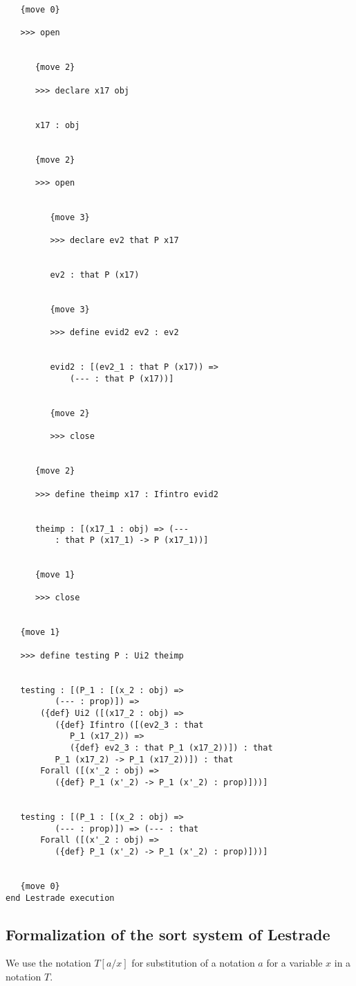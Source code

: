 \documentclass[12pt]{article}
\begin{document}
\begin{verbatim}
   {move 0}

   >>> open


      {move 2}

      >>> declare x17 obj


      x17 : obj


      {move 2}

      >>> open


         {move 3}

         >>> declare ev2 that P x17


         ev2 : that P (x17)


         {move 3}

         >>> define evid2 ev2 : ev2


         evid2 : [(ev2_1 : that P (x17)) => 
             (--- : that P (x17))]


         {move 2}

         >>> close


      {move 2}

      >>> define theimp x17 : Ifintro evid2


      theimp : [(x17_1 : obj) => (--- 
          : that P (x17_1) -> P (x17_1))]


      {move 1}

      >>> close


   {move 1}

   >>> define testing P : Ui2 theimp


   testing : [(P_1 : [(x_2 : obj) => 
          (--- : prop)]) => 
       ({def} Ui2 ([(x17_2 : obj) => 
          ({def} Ifintro ([(ev2_3 : that 
             P_1 (x17_2)) => 
             ({def} ev2_3 : that P_1 (x17_2))]) : that 
          P_1 (x17_2) -> P_1 (x17_2))]) : that 
       Forall ([(x'_2 : obj) => 
          ({def} P_1 (x'_2) -> P_1 (x'_2) : prop)]))]


   testing : [(P_1 : [(x_2 : obj) => 
          (--- : prop)]) => (--- : that 
       Forall ([(x'_2 : obj) => 
          ({def} P_1 (x'_2) -> P_1 (x'_2) : prop)]))]


   {move 0}
end Lestrade execution
\end{verbatim}

\newpage

\subsection{Formalization of the sort system of Lestrade}

We use the notation $T[a/x]$  for substitution of a notation $a$ for a variable $x$ in a notation $T$.
\end{document}

